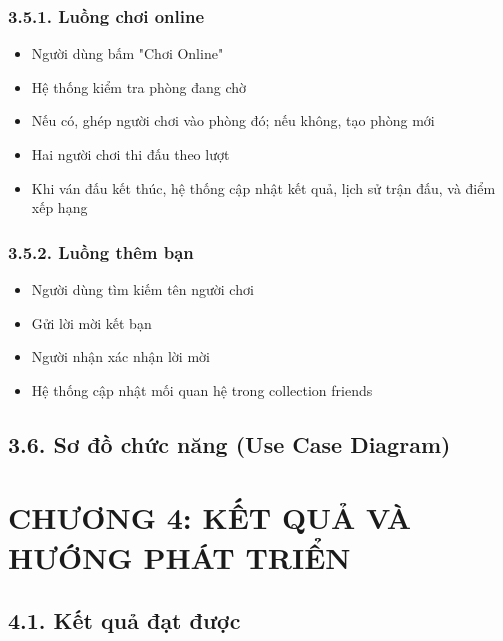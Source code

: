 \documentclass[a4paper,12pt]{article}
\begin{document}
\subsubsection*{3.5.1. Luồng chơi online} %


\begin{itemize}[label=·]
    \item Người dùng bấm "Chơi Online"
    \item Hệ thống kiểm tra phòng đang chờ
    \item Nếu có, ghép người chơi vào phòng đó; nếu không, tạo phòng mới
    \item Hai người chơi thi đấu theo lượt
    \item Khi ván đấu kết thúc, hệ thống cập nhật kết quả, lịch sử trận đấu, và điểm xếp hạng
\end{itemize}

\subsubsection*{3.5.2. Luồng thêm bạn} %


\begin{itemize}[label=·]
    \item Người dùng tìm kiếm tên người chơi
    \item Gửi lời mời kết bạn
    \item Người nhận xác nhận lời mời
    \item Hệ thống cập nhật mối quan hệ trong collection friends
\end{itemize}

\subsection*{3.6. Sơ đồ chức năng (Use Case Diagram)} %

\section*{\centering \textbf{CHƯƠNG 4: KẾT QUẢ VÀ HƯỚNG PHÁT TRIỂN}} %

\subsection*{4.1. Kết quả đạt được} %
\end{document}
